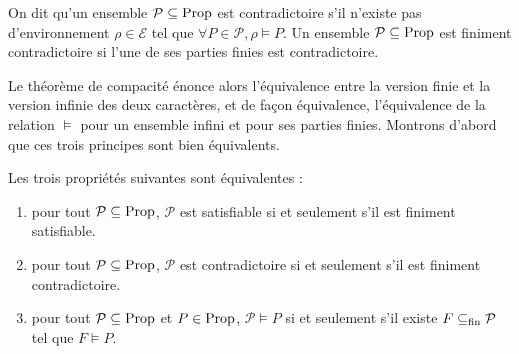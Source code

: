 \begin{definition}[Contradiction]
  On dit qu'un ensemble $\mathcal P\subseteq\operatorname{Prop}$ est contradictoire s'il
  n'existe pas d'environnement $\rho\in\mathcal E$ tel que
  $\forall P \in\mathcal P, \rho\models P$. Un ensemble
  $\mathcal P\subseteq \operatorname{Prop}$ est finiment contradictoire si l'une de ses
  parties finies est contradictoire.
\end{definition}

Le théorème de compacité énonce alors l'équivalence entre la version finie et la
version infinie des deux caractères, et de façon équivalence, l'équivalence de
la relation $\vDash$ pour un ensemble infini et pour ses parties finies.
Montrons d'abord que ces trois principes sont bien équivalents.

\begin{proposition}
  Les trois propriétés suivantes sont équivalentes :
  \begin{enumerate}[label=(\roman*)]
  \item\label{enum.compac.prop1} pour tout $\mathcal P\subseteq \operatorname{Prop}$,
    $\mathcal P$ est satisfiable si et seulement s'il est finiment satisfiable.
  \item\label{enum.compac.prop2} pour tout $\mathcal P\subseteq\operatorname{Prop}$,
    $\mathcal P$ est contradictoire si et seulement s'il est finiment
    contradictoire.
  \item\label{enum.compac.prop3} pour tout $\mathcal P\subseteq\operatorname{Prop}$ et
    $P\in\operatorname{Prop}$, $\mathcal P\vDash P$ si et seulement s'il existe
    $F\subseteq_{\mathrm{fin}} \mathcal P$ tel que $F\vDash P$.
  \end{enumerate}
\end{proposition}


